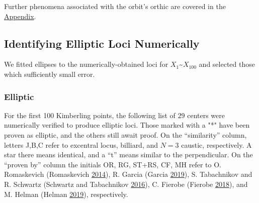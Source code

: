 \documentclass[]{article}
\begin{document}
Further phenomena associated with the orbit's orthic are covered in the \href{appendices.html}{Appendix}.

\hypertarget{identifying-elliptic-loci-numerically}{%
\subsection{Identifying Elliptic Loci Numerically}\label{identifying-elliptic-loci-numerically}}

We fitted ellipses to the numerically-obtained loci for \(X_1\)\textasciitilde{}\(X_{100}\) and selected those which sufficiently small error.

\hypertarget{elliptic}{%
\subsubsection{Elliptic}\label{elliptic}}

For the first 100 Kimberling points, the following list of \(29\) centers were numerically verified to produce elliptic loci. Those marked with a "*" have been proven as elliptic, and the others still await proof. On the ``similarity'' column, letters J,B,C refer to excentral locus, billiard, and \(N=3\) caustic, respectively. A star there means identical, and a ``t'' means similar to the perpendicular. On the ``proven by'' column the initials OR, RG, ST+RS, CF, MH refer to O. Romaskevich (Romaskevich \protect\hyperlink{ref-olga14}{2014}), R. Garcia (Garcia \protect\hyperlink{ref-ronaldo19}{2019}), S. Tabachnikov and R. Schwartz (Schwartz and Tabachnikov \protect\hyperlink{ref-sergei2016}{2016}), C. Fierobe (Fierobe \protect\hyperlink{ref-corentin19}{2018}), and M. Helman (Helman \protect\hyperlink{ref-helman19}{2019}), respectively.
\end{document}
